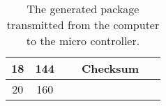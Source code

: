 \begin{table}[H]
\begin{tabular}{llclllllllllllllll}
		\multicolumn{1}{|c|}{18}   & \multicolumn{1}{c|}{144} & \multicolumn{16}{c|}{Checksum}                                                       \\ \hline
		\multicolumn{1}{|c|}{20}   & \multicolumn{1}{c|}{160} & \multicolumn{8}{c|}{}                                                                                                                                                                                 & \multicolumn{1}{c|}{}  & \multicolumn{1}{c|}{}  & \multicolumn{1}{c|}{}   & \multicolumn{1}{c|}{}   & \multicolumn{1}{c|}{}   & \multicolumn{1}{c|}{}   & \multicolumn{1}{c|}{}   & \multicolumn{1}{c|}{}   \\ \hline
	\end{tabular}
	\caption{The generated package transmitted from the computer to the micro controller.}
	\label{tab:Packagestructure2}
\end{table}
